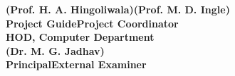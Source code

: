 \begin{spacing}{0}
\vspace{3.0cm}
\large{\textbf{(Prof. H. A. Hingoliwala)}}\hspace*{2.2in}\large{\textbf{(Prof. M. D. Ingle)}}\\
\hspace*{0.7in}\textbf{Project Guide}\hspace*{2.6in}\textbf{Project Coordinator}\\
\hspace*{0.1cm}\textbf{HOD, Computer Department}\\[3cm]
\hspace*{0.5in}\large{\textbf{(Dr. M. G. Jadhav)}}\\
\hspace*{0.9in}\textbf{Principal}\hspace*{2.8in}\textbf{External Examiner}\\[0.5cm]
\end{spacing}
\newpage